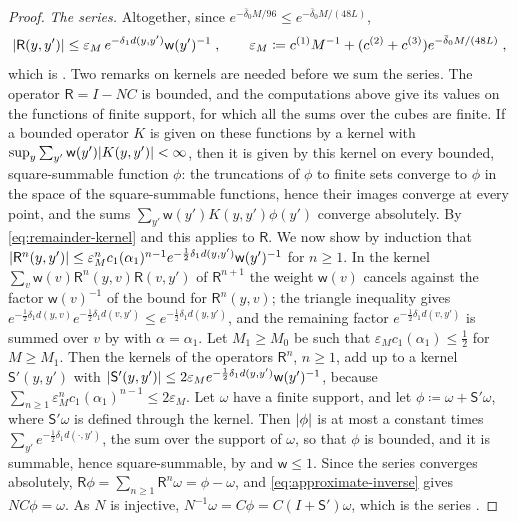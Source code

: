 \documentclass[11pt]{preprint}
\DeclarePairedDelimiter{\abs}{\lvert}{\rvert}
\numberwithin{equation}{section}
\theoremstyle{definition}
\theoremstyle{remark}
\theoremstyle{plain}
\begin{document}
\begin{proof}
\emph{The series.} Altogether, since $e^{-\bar\delta_0M/96} \leq e^{-\bar\delta_0M/(48L)}$,
\begin{equation}\label{eq:remainder-kernel}
    \abs{\mathsf R(y, y')} \leq \varepsilon_M\,e^{-\delta_1d(y, y')}\mathsf w(y')^{-1}\;,
    \qquad
    \varepsilon_M \coloneqq c^{(1)}M^{-1} + (c^{(2)} + c^{(3)})e^{-\bar\delta_0M/(48L)}\;,
\end{equation}
which is \cite[(2.85)]{BalabanPRT2}. Two remarks on kernels are needed before we sum the series. The operator $\mathsf R = I - NC$ is bounded, and the computations above give its values on the functions of finite support, for which all the sums over the cubes are finite. If a bounded operator $K$ is given on these functions by a kernel with $\sup_y\sum_{y'}\mathsf w(y')\abs{K(y, y')} < \infty$, then it is given by this kernel on every bounded, square-summable function $\phi$: the truncations of $\phi$ to finite sets converge to $\phi$ in the space of the square-summable functions, hence their images converge at every point, and the sums $\sum_{y'}\mathsf w(y')K(y, y')\phi(y')$ converge absolutely. By \eqref{eq:remainder-kernel} and \cite[(2.61)]{BalabanPRT2} this applies to $\mathsf R$. We now show by induction that $\abs{\mathsf R^n(y, y')} \leq \varepsilon_M^nc_1(\alpha_1)^{n-1}e^{-\frac12\delta_1d(y, y')}\mathsf w(y')^{-1}$ for $n \geq 1$. In the kernel $\sum_v\mathsf w(v)\mathsf R^n(y, v)\mathsf R(v, y')$ of $\mathsf R^{n+1}$ the weight $\mathsf w(v)$ cancels against the factor $\mathsf w(v)^{-1}$ of the bound for $\mathsf R^n(y, v)$; the triangle inequality gives $e^{-\frac12\delta_1d(y, v)}e^{-\frac12\delta_1d(v, y')} \leq e^{-\frac12\delta_1d(y, y')}$, and the remaining factor $e^{-\frac12\delta_1d(v, y')}$ is summed over $v$ by \cite[(2.61)]{BalabanPRT2} with $\alpha = \alpha_1$. Let $M_1 \geq M_0$ be such that $\varepsilon_Mc_1(\alpha_1) \leq \frac12$ for $M \geq M_1$. Then the kernels of the operators $\mathsf R^n$, $n \geq 1$, add up to a kernel $\mathsf S'(y, y')$ with $\abs{\mathsf S'(y, y')} \leq 2\varepsilon_Me^{-\frac12\delta_1d(y, y')}\mathsf w(y')^{-1}$, because $\sum_{n \geq 1}\varepsilon_M^nc_1(\alpha_1)^{n-1} \leq 2\varepsilon_M$. Let $\omega$ have a finite support, and let $\phi \coloneqq \omega + \mathsf S'\omega$, where $\mathsf S'\omega$ is defined through the kernel. Then $\abs\phi$ is at most a constant times $\sum_{y'}e^{-\frac12\delta_1d(\cdot, y')}$, the sum over the support of $\omega$, so that $\phi$ is bounded, and it is summable, hence square-summable, by \cite[(2.61)]{BalabanPRT2} and $\mathsf w \leq 1$. Since the series converges absolutely, $\mathsf R\phi = \sum_{n \geq 1}\mathsf R^n\omega = \phi - \omega$, and \eqref{eq:approximate-inverse} gives $NC\phi = \omega$. As $N$ is injective, $N^{-1}\omega = C\phi = C(I + \mathsf S')\omega$, which is the series \cite[(2.86)]{BalabanPRT2}.


\end{proof}
\end{document}
